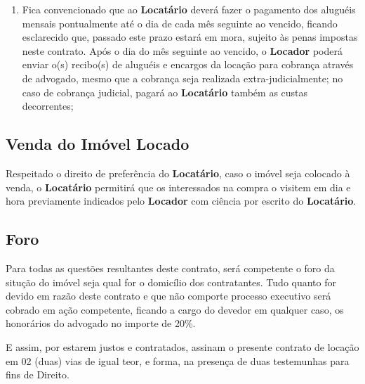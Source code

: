 \begin{enumerate}
    \item Fica convencionado que ao \textbf{Locatário} deverá fazer o pagamento dos aluguéis mensais pontualmente até o dia \diadepagamento de cada mês seguinte ao vencido, ficando esclarecido que, passado este prazo estará em mora, sujeito às penas impostas neste contrato. Após o dia \diadepagamento do mês seguinte ao vencido, o \textbf{Locador} poderá enviar o(s) recibo(s) de aluguéis e encargos da locação para cobrança através de advogado, mesmo que a cobrança seja realizada extra-judicialmente; no caso de cobrança judicial, pagará ao \textbf{Locatário} também as custas decorrentes;
\end{enumerate}

\subsection{Venda do Imóvel Locado}

Respeitado o direito de preferência do \textbf{Locatário}, caso o imóvel seja colocado à venda, o \textbf{Locatário} permitirá que os interessados na compra o visitem em dia e hora previamente indicados pelo \textbf{Locador} com ciência por escrito do \textbf{Locatário}.

\subsection{Foro}

Para todas as questões resultantes deste contrato, será competente o foro da situção do imóvel seja qual for o domicílio dos contratantes. Tudo quanto for devido em razão deste contrato e que não comporte processo executivo será cobrado em ação competente, ficando a cargo do devedor em qualquer caso, os honorários do advogado no importe de 20\%.

E assim, por estarem justos e contratados, assinam o presente contrato de locação em 02 (duas) vias de igual teor, e forma, na presença de duas testemunhas para fins de Direito.